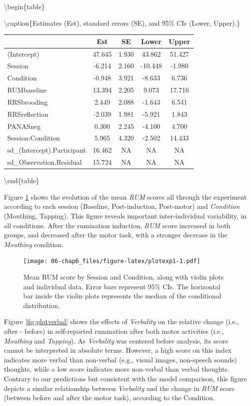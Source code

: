 \documentclass[12pt,]{book}
\begin{document}
\textbackslash{}begin\{table\}

\textbackslash{}caption\{\label{tab:paramexp2}Estimates (Est), standard
errors (SE), and 95\% CIs (Lower, Upper).\} \centering

\begin{tabular}[t]{l|c|c|c|c}
\hline
 & Est & SE & Lower & Upper\\
\hline
(Intercept) & 47.645 & 1.930 & 43.862 & 51.427\\
\hline
Session & -6.214 & 2.160 & -10.448 & -1.980\\
\hline
Condition & -0.948 & 3.921 & -8.633 & 6.736\\
\hline
RUMbaseline & 13.394 & 2.205 & 9.073 & 17.716\\
\hline
RRSbrooding & 2.449 & 2.088 & -1.643 & 6.541\\
\hline
RRSreflection & -2.039 & 1.981 & -5.921 & 1.843\\
\hline
PANASneg & 0.300 & 2.245 & -4.100 & 4.700\\
\hline
Session:Condition & 5.965 & 4.320 & -2.502 & 14.433\\
\hline
sd\_(Intercept).Participant & 16.462 & NA & NA & NA\\
\hline
sd\_Observation.Residual & 15.724 & NA & NA & NA\\
\hline
\end{tabular}

\textbackslash{}end\{table\}

Figure \ref{fig:plotexp1} shows the evolution of the mean \emph{RUM}
scores all through the experiment according to each session (Baseline,
Post-induction, Post-motor) and \emph{Condition} (Mouthing, Tapping).
This figure reveals important inter-individual variability, in all
conditions. After the rumination induction, \emph{RUM} score increased
in both groups, and decreased after the motor task, with a stronger
decrease in the \emph{Mouthing} condition.

\begin{figure}
\centering
\texttt{[image: 06-chap6\_files/figure-latex/plotexp1-1.pdf]}
\caption{\label{fig:plotexp1}Mean RUM score by Session and Condition, along
with violin plots and individual data. Error bars represent 95\% CIs.
The horizontal bar inside the violin plots represents the median of the
conditional distribution.}
\end{figure}

Figure \ref{fig:plotverbal} shows the effects of \emph{Verbality} on the
relative change (i.e., after - before) in self-reported rumination after
both motor activities (i.e., \emph{Mouthing} and \emph{Tapping}). As
\emph{Verbality} was centered before analysis, its score cannot be
interpreted in absolute terms. However, a high score on this index
indicates more verbal than non-verbal (e.g., visual images, non-speech
sounds) thoughts, while a low score indicates more non-verbal than
verbal thoughts. Contrary to our predictions but consistent with the
model comparison, this figure depicts a similar relationship between
\emph{Verbality} and the change in \emph{RUM} score (between before and
after the motor task), according to the Condition.
\end{document}
